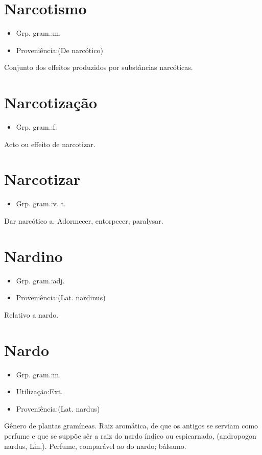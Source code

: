 \section{Narcotismo}
\begin{itemize}
\item {Grp. gram.:m.}
\end{itemize}
\begin{itemize}
\item {Proveniência:(De \textunderscore narcótico\textunderscore )}
\end{itemize}
Conjunto dos effeitos produzidos por substâncias narcóticas.
\section{Narcotização}
\begin{itemize}
\item {Grp. gram.:f.}
\end{itemize}
Acto ou effeito de narcotizar.
\section{Narcotizar}
\begin{itemize}
\item {Grp. gram.:v. t.}
\end{itemize}
Dar narcótico a.
Adormecer, entorpecer, paralysar.
\section{Nardino}
\begin{itemize}
\item {Grp. gram.:adj.}
\end{itemize}
\begin{itemize}
\item {Proveniência:(Lat. \textunderscore nardinus\textunderscore )}
\end{itemize}
Relativo a nardo.
\section{Nardo}
\begin{itemize}
\item {Grp. gram.:m.}
\end{itemize}
\begin{itemize}
\item {Utilização:Ext.}
\end{itemize}
\begin{itemize}
\item {Proveniência:(Lat. \textunderscore nardus\textunderscore )}
\end{itemize}
Gênero de plantas gramíneas.
Raiz aromática, de que os antigos se serviam como perfume e que se suppõe sêr a raiz do nardo índico ou espicarnado, (\textunderscore andropogon nardus\textunderscore , Lin.).
Perfume, comparável ao do nardo; bálsamo.
